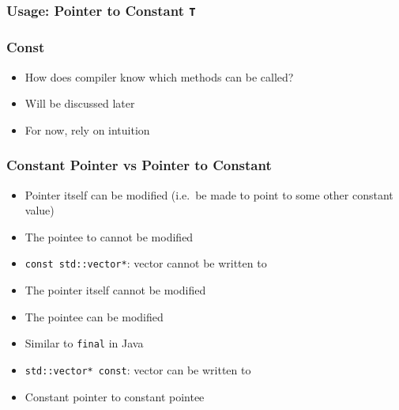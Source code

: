 \begin{frame}
  \frametitle{Usage: Pointer to Constant {\tt T}}
\end{frame}

\begin{frame}
  \frametitle{Const}
  \begin{itemize}
    \item How does compiler know which methods can be called?
    \item Will be discussed later
    \item For now, rely on intuition
  \end{itemize}
\end{frame}

\begin{frame}
  \frametitle{Constant Pointer vs Pointer to Constant}
  \begin{itemize}
    \item Pointer itself can be modified (i.e.\ be made to point to some other constant value)
    \item The pointee to cannot be modified
    \item {\tt const std::vector*}: vector cannot be written to
  \end{itemize}
  \vskip2mm
  \begin{itemize}
    \item The pointer itself cannot be modified
    \item The pointee can be modified
    \item Similar to {\tt final} in Java
    \item {\tt std::vector* const}: vector can be written to
  \end{itemize}
  \vskip2mm
  \begin{itemize}
    \item Constant pointer to constant pointee
  \end{itemize}
\end{frame}





